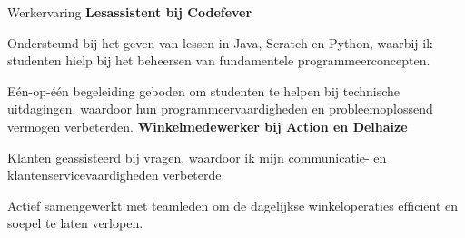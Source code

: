 \begin{rubric}{Werkervaring}
        \textbf{Lesassistent bij Codefever}\par
        Ondersteund bij het geven van lessen in Java, Scratch en Python, 
        waarbij ik studenten hielp bij het beheersen van 
        fundamentele programmeerconcepten.
        \par
        Eén-op-één begeleiding geboden om studenten te helpen bij 
        technische uitdagingen, waardoor hun 
        programmeervaardigheden en probleemoplossend vermogen 
        verbeterden.
        \textbf{Winkelmedewerker bij Action en Delhaize}\par
        Klanten geassisteerd bij vragen, waardoor ik mijn communicatie- en 
        klantenservicevaardigheden verbeterde.
        \par
        Actief samengewerkt met teamleden om de dagelijkse 
        winkeloperaties efficiënt en soepel te laten verlopen.
\end{rubric}

